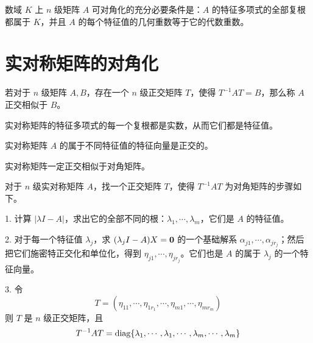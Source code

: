 \begin{theorem}
    数域 $K$ 上 $n$ 级矩阵 $A$ 可对角化的充分必要条件是：$A$ 的特征多项式的全部复根都属于 $K$，并且 $A$ 的每个特征值的几何重数等于它的代数重数。
\end{theorem}

\section{实对称矩阵的对角化}

若对于 $n$ 级矩阵 $A,B$，存在一个 $n$ 级正交矩阵 $T$，使得 $T^{-1}AT=B$，那么称 $A$ 正交相似于 $B$。

\begin{theorem}
    实对称矩阵的特征多项式的每一个复根都是实数，从而它们都是特征值。
\end{theorem}

\begin{theorem}
    实对称矩阵 $A$ 的属于不同特征值的特征向量是正交的。
\end{theorem}

\begin{theorem}
    实对称矩阵一定正交相似于对角矩阵。
\end{theorem}

对于 $n$ 级实对称矩阵 $A$，找一个正交矩阵 $T$，使得 $T^{-1}AT$ 为对角矩阵的步骤如下。

1. 计算 $|\lambda I- A|$，求出它的全部不同的根：$\lambda_1,\cdots,\lambda_m$，它们是 $A$ 的特征值。

2. 对于每一个特征值 $\lambda_j$，求 $(\lambda_jI-A)X = \boldsymbol{0}$ 的一个基础解系 $\alpha_{j1},\cdots,\alpha_{jr_j}$；然后把它们施密特正交化和单位化，得到 $\eta_{j1},\cdots,\eta_{jr_j}$。它们也是 $A$ 的属于 $\lambda_j$ 的一个特征向量。

3. 令
\[T=(\eta_{11},\cdots,\eta_{1r_1},\cdots,\eta_{m1},\cdots,\eta_{mr_m})\]
则 $T$ 是 $n$ 级正交矩阵，且
\[T^{-1}AT = \operatorname{diag}\{\lambda_{1},\cdots,\lambda_{1},\cdots,\lambda_{m},\cdots,\lambda_{m}\}\]
